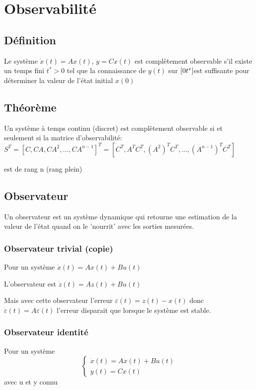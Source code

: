 \documentclass[resume]{subfiles}
\begin{document}
\section{Observabilité}

\subsection{Définition}

Le système $\dot{x}(t) = Ax (t)$, $y = Cx(t)$   est complètement observable s'il existe un temps fini $t^* > 0$ tel que la  connaissance de $y (t)$  sur $[0\space t^*]$est suffisante pour déterminer la valeur de l'état initial $x(0)$

\subsection{Théorème}

Un système à temps continu (discret) est complètement observable si et  seulement si la matrice d'observabilité: $S^T = [C, CA, CA^2 ,..., CA^{n-1}]^T = [C^T, A^TC^T , (A^2)^T C^T,..., (A^{n-1})^T C^T]$ 

 est de rang n (rang plein)

\subsection{Observateur}

Un observateur est un système dynamique qui retourne une estimation de la valeur de l'état quand on le 'nourrit' avec les sorties mesurées.

\subsubsection{Observateur trivial (copie)}

Pour un système $\dot{x}(t)=Ax(t)+Bu(t)$

L'observateur est $\dot{z}(t)= Az(t)+Bu(t)$

Mais avec cette observateur l'erreur $\varepsilon(t)=z(t)-x(t)$ donc $\dot{\varepsilon}(t)=A\varepsilon(t)$ l'erreur disparait que lorsque le système est stable.

\subsubsection{Observateur identité}

Pour un système \begin{equation}\begin{cases}\dot{x}(t)=Ax(t)+Bu(t)\\y(t)=Cx(t)\end{cases}\end{equation} avec u et y connu
\end{document}
